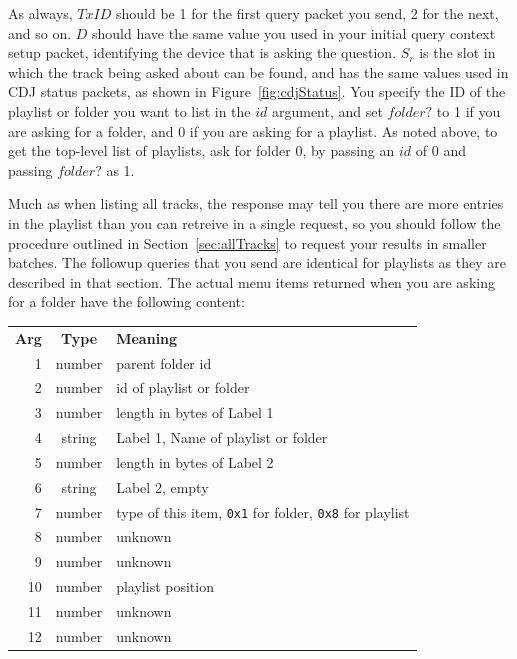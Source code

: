 \documentclass[11pt]{article}
\begin{document}
As always, $TxID$ should be 1 for the first query packet you send, 2
for the next, and so on. $D$ should have the same value you used in
your initial query context setup packet, identifying the device that
is asking the question. $S_r$ is the slot in which the track being
asked about can be found, and has the same values used in CDJ status
packets, as shown in Figure~\ref{fig:cdjStatus}. You specify the ID of
the playlist or folder you want to list in the $id$ argument, and set
$folder?$ to 1 if you are asking for a folder, and 0 if you are asking
for a playlist. As noted above, to get the top-level list of
playlists, ask for folder 0, by passing an $id$ of 0 and passing
$folder?$ as 1.

Much as when listing all tracks, the response may tell you there are
more entries in the playlist than you can retreive in a single
request, so you should follow the procedure outlined in
Section~\ref{sec:allTracks} to request your results in smaller
batches. The followup queries that you send are identical for
playlists as they are described in that section. The actual menu items
returned when you are asking for a folder have the following content:

\begin{center}
  \begin{tabu}{rcX}
    \toprule

    \bfseries{Arg} & \bfseries{Type} & \bfseries{Meaning} \\

    1 & number & parent folder id \\

    2 & number & id of playlist or folder \\

    3 & number & length in bytes of Label 1 \\

    4 & string & Label 1, Name of playlist or folder \\

    5 & number & length in bytes of Label 2 \\

    6 & string & Label 2, empty \\

    7 & number & type of this item, {\tt 0x1} for folder, {\tt 0x8} for playlist \\

    8 & number & unknown \\

    9 & number & unknown \\

    10 & number & playlist position \\

    11 & number & unknown \\

    12 & number & unknown \\

    \bottomrule
  \end{tabu}
\end{center}
\end{document}
